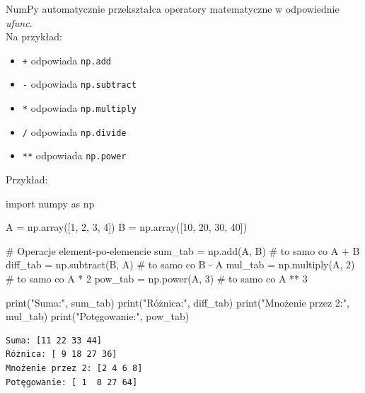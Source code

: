 \documentclass[
  polish,
  letterpaper,
  DIV=11,
  numbers=noendperiod]{scrreprt}
\newenvironment{Shaded}{\begin{snugshade}}{\end{snugshade}}
\newcommand{\BuiltInTok}[1]{\textcolor[rgb]{0.00,0.23,0.31}{#1}}
\newcommand{\CommentTok}[1]{\textcolor[rgb]{0.37,0.37,0.37}{#1}}
\newcommand{\DecValTok}[1]{\textcolor[rgb]{0.68,0.00,0.00}{#1}}
\newcommand{\ImportTok}[1]{\textcolor[rgb]{0.00,0.46,0.62}{#1}}
\newcommand{\NormalTok}[1]{\textcolor[rgb]{0.00,0.23,0.31}{#1}}
\newcommand{\OperatorTok}[1]{\textcolor[rgb]{0.37,0.37,0.37}{#1}}
\newcommand{\StringTok}[1]{\textcolor[rgb]{0.13,0.47,0.30}{#1}}
\providecommand{\tightlist}{%
  \setlength{\itemsep}{0pt}\setlength{\parskip}{0pt}}
\begin{document}
NumPy automatycznie przekształca operatory matematyczne w odpowiednie
\emph{ufunc}.\\
Na przykład:

\begin{itemize}
\tightlist
\item
  \texttt{+} odpowiada \texttt{np.add}
\item
  \texttt{-} odpowiada \texttt{np.subtract}
\item
  \texttt{*} odpowiada \texttt{np.multiply}
\item
  \texttt{/} odpowiada \texttt{np.divide}
\item
  \texttt{**} odpowiada \texttt{np.power}
\end{itemize}

Przykład:

\begin{Shaded}
\begin{Highlighting}[]
\ImportTok{import}\NormalTok{ numpy }\ImportTok{as}\NormalTok{ np}

\NormalTok{A }\OperatorTok{=}\NormalTok{ np.array([}\DecValTok{1}\NormalTok{, }\DecValTok{2}\NormalTok{, }\DecValTok{3}\NormalTok{, }\DecValTok{4}\NormalTok{])}
\NormalTok{B }\OperatorTok{=}\NormalTok{ np.array([}\DecValTok{10}\NormalTok{, }\DecValTok{20}\NormalTok{, }\DecValTok{30}\NormalTok{, }\DecValTok{40}\NormalTok{])}

\CommentTok{\# Operacje element{-}po{-}elemencie}
\NormalTok{sum\_tab }\OperatorTok{=}\NormalTok{ np.add(A, B)       }\CommentTok{\# to samo co A + B}
\NormalTok{diff\_tab }\OperatorTok{=}\NormalTok{ np.subtract(B, A) }\CommentTok{\# to samo co B {-} A}
\NormalTok{mul\_tab }\OperatorTok{=}\NormalTok{ np.multiply(A, }\DecValTok{2}\NormalTok{)  }\CommentTok{\# to samo co A * 2}
\NormalTok{pow\_tab }\OperatorTok{=}\NormalTok{ np.power(A, }\DecValTok{3}\NormalTok{)     }\CommentTok{\# to samo co A ** 3}

\BuiltInTok{print}\NormalTok{(}\StringTok{"Suma:"}\NormalTok{, sum\_tab)}
\BuiltInTok{print}\NormalTok{(}\StringTok{"Różnica:"}\NormalTok{, diff\_tab)}
\BuiltInTok{print}\NormalTok{(}\StringTok{"Mnożenie przez 2:"}\NormalTok{, mul\_tab)}
\BuiltInTok{print}\NormalTok{(}\StringTok{"Potęgowanie:"}\NormalTok{, pow\_tab)}
\end{Highlighting}
\end{Shaded}

\begin{verbatim}
Suma: [11 22 33 44]
Różnica: [ 9 18 27 36]
Mnożenie przez 2: [2 4 6 8]
Potęgowanie: [ 1  8 27 64]
\end{verbatim}
\end{document}

